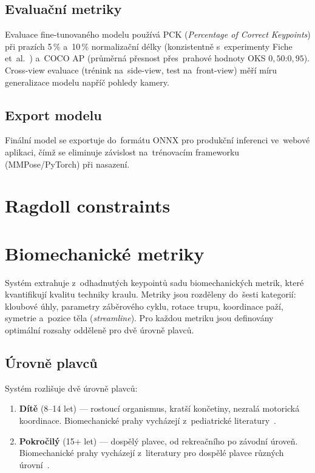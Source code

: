 \subsection{Evaluační metriky}

Evaluace fine-tunovaného modelu používá PCK (\textit{Percentage of Correct Keypoints}) při prazích 5\,\% a~10\,\% normalizační délky (konzistentně s~experimenty Fiche et~al.~\cite{fiche2023swimxyz}) a~COCO AP (průměrná přesnost přes~prahové hodnoty OKS $0{,}50$:$0{,}95$). Cross-view evaluace (trénink na~side-view, test na~front-view) měří míru generalizace modelu napříč pohledy kamery.

\subsection{Export modelu}

Finální model se exportuje do~formátu ONNX pro produkční inferenci ve~webové aplikaci, čímž se eliminuje závislost na~trénovacím frameworku (MMPose/PyTorch) při nasazení.

\section{Ragdoll constraints}
\label{sec:ragdoll}

\section{Biomechanické metriky}
\label{sec:metriky}

Systém extrahuje z~odhadnutých keypointů sadu biomechanických metrik, které kvantifikují kvalitu techniky kraulu. Metriky jsou rozděleny do~šesti kategorií: kloubové úhly, parametry záběrového cyklu, rotace trupu, koordinace paží, symetrie a~pozice těla (\textit{streamline}). Pro každou metriku jsou definovány optimální rozsahy odděleně pro dvě úrovně plavců.

\subsection{Úrovně plavců}
\label{subsec:urovne}

Systém rozlišuje dvě úrovně plavců:
\begin{enumerate}
    \item \textbf{Dítě} (8--14 let) --- rostoucí organismus, kratší končetiny, nezralá motorická koordinace. Biomechanické prahy vycházejí z~pediatrické literatury~\cite{jerszynski2013,barbosa2019,santos2023}.
    \item \textbf{Pokročilý} (15+ let) --- dospělý plavec, od rekreačního po závodní úroveň. Biomechanické prahy vycházejí z~literatury pro dospělé plavce různých úrovní~\cite{schnitzler2021,chollet2000,maglischo2003}.
\end{enumerate}

